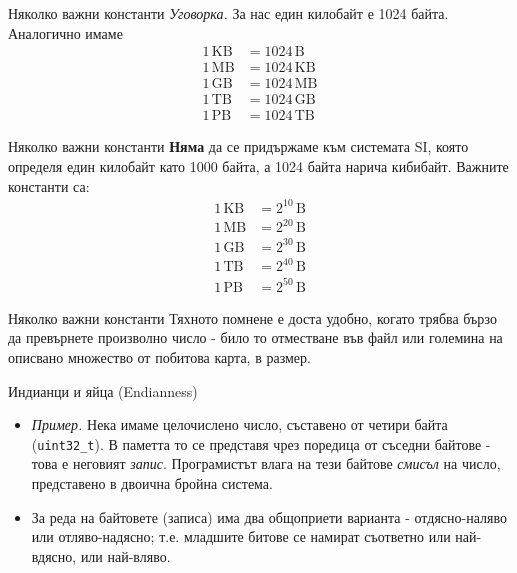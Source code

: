 \documentclass[14pt, aspectratio=169]{beamer}
\begin{document}
\begin{frame}{Няколко важни константи}
  \emph{Уговорка.} За нас един килобайт е 1024 байта. Аналогично имаме
  \seg
  \[
    \begin{aligned}
      1\,\text{KB} &= 1024\,\text{B} \\
      1\,\text{MB} &= 1024\,\text{KB} \\
      1\,\text{GB} &= 1024\,\text{MB} \\
      1\,\text{TB} &= 1024\,\text{GB} \\
      1\,\text{PB} &= 1024\,\text{TB}
    \end{aligned}
  \]
\end{frame}

\begin{frame}{Няколко важни константи}
  \textbf{Няма} да се придържаме към системата SI, която определя един
  килобайт като 1000 байта, а 1024 байта нарича кибибайт. Важните константи
  са:
  \seg
  \[
    \begin{aligned}
      1\,\text{KB} &= 2^{10}\,\text{B} \\
      1\,\text{MB} &= 2^{20}\,\text{B} \\
      1\,\text{GB} &= 2^{30}\,\text{B} \\
      1\,\text{TB} &= 2^{40}\,\text{B} \\
      1\,\text{PB} &= 2^{50}\,\text{B}
    \end{aligned}
  \]
\end{frame}

\begin{frame}{Няколко важни константи}
  Тяхното помнене е доста удобно, когато трябва бързо да превърнете
  произволно число - било то отместване във файл или големина на описвано
  множество от побитова карта, в размер.
\end{frame}

\begin{frame}{Индианци и яйца (Endianness)}
  \begin{itemize}
    \item \emph{Пример.} Нека имаме целочислено число, съставено от четири
      байта (\texttt{uint32\_t}). В паметта то се представя чрез поредица от
      съседни байтове - това е неговият \emph{запис}. Програмистът влага на
      тези байтове \emph{смисъл} на число, представено в двоична бройна
      система.
    \item За реда на байтовете (записа) има два общоприети варианта -
      отдясно-наляво или отляво-надясно; т.е. младшите битове се намират
      съответно или най-вдясно, или най-вляво.
  \end{itemize}
\end{frame}
\end{document}

